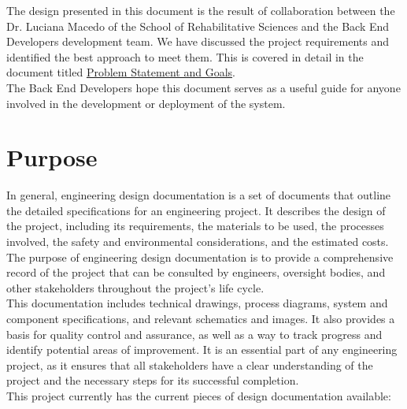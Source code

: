 \documentclass[12pt, titlepage]{article}
\begin{document}
The design presented in this document is the result of collaboration between the Dr. Luciana Macedo of the School of Rehabilitative Sciences and the Back End Developers development team. We have discussed the project requirements and identified the best approach to meet them. This is covered in detail in the document titled \href{https://github.com/zakerl/Capstone_Project/blob/desDoc_Labeeb/docs/ProblemStatementAndGoals/Team1_ProblemStatement\%20\%26\%20Goals.pdf}{Problem Statement and Goals}.\\

The Back End Developers hope this document serves as a useful guide for anyone involved in the development or deployment of the system. \\


\section{Purpose}

In general, engineering design documentation is a set of documents that outline the detailed specifications for an engineering project. It describes the design of the project, including its requirements, the materials to be used, the processes involved, the safety and environmental considerations, and the estimated costs. The purpose of engineering design documentation is to provide a comprehensive record of the project that can be consulted by engineers, oversight bodies, and other stakeholders throughout the project’s life cycle.\\

This documentation includes technical drawings, process diagrams, system and component specifications, and relevant schematics and images. It also provides a basis for quality control and assurance, as well as a way to track progress and identify potential areas of improvement. It is an essential part of any engineering project, as it ensures that all stakeholders have a clear understanding of the project and the necessary steps for its successful completion.\\
\newpage
This project currently has the current pieces of design documentation available:
\end{document}
